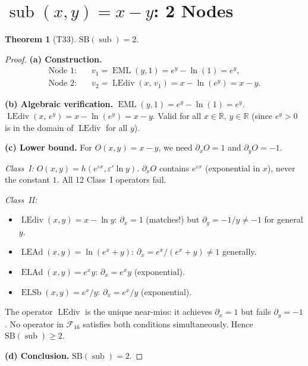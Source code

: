\documentclass[12pt,a4paper]{article}
\newtheorem{theorem}{Theorem}[section]
\theoremstyle{definition}
\newcommand{\EML}{\operatorname{EML}}
\newcommand{\ELAd}{\operatorname{ELAd}}
\newcommand{\ELSb}{\operatorname{ELSb}}
\newcommand{\LEAd}{\operatorname{LEAd}}
\newcommand{\LEdiv}{\operatorname{LEdiv}}
\newcommand{\subop}{\operatorname{sub}}
\newcommand{\SB}{\mathrm{SB}}
\newcommand{\F}{\mathcal{F}_{16}}
\begin{document}
\section{\texorpdfstring{$\subop(x,y) = x-y$}{sub(x,y)}: 2 Nodes}
\label{sec:sub}

\begin{theorem}[T33]
\label{thm:sub}
$\SB(\subop) = 2$.
\end{theorem}

\begin{proof}
\textbf{(a) Construction.}
\begin{align*}
  \text{Node 1:} &\quad v_1 = \EML(y,1) = e^y - \ln(1) = e^y, \\
  \text{Node 2:} &\quad v_2 = \LEdiv(x,\,v_1) = x - \ln(e^y) = x - y.
\end{align*}

\textbf{(b) Algebraic verification.}
$\EML(y,1) = e^y - \ln(1) = e^y$.
$\LEdiv(x,\,e^y) = x - \ln(e^y) = x - y$.
Valid for all $x\in\mathbb{R}$, $y\in\mathbb{R}$
(since $e^y > 0$ is in the domain of $\LEdiv$ for all $y$).

\textbf{(c) Lower bound.}
For $O(x,y) = x-y$, we need $\partial_x O = 1$ and $\partial_y O = -1$.

\emph{Class~I:} $O(x,y) = h(e^{\varepsilon x}, \varepsilon'\ln y)$.
$\partial_x O$ contains $e^{\varepsilon x}$ (exponential in $x$), never the
constant $1$.  All 12 Class~I operators fail.

\emph{Class~II:}
\begin{itemize}
  \item $\LEdiv(x,y) = x - \ln y$:\;
    $\partial_x = 1$ (matches!) but $\partial_y = -1/y \ne -1$ for general $y$.
  \item $\LEAd(x,y) = \ln(e^x+y)$:\;
    $\partial_x = e^x/(e^x+y) \ne 1$ generally.
  \item $\ELAd(x,y) = e^x y$:\;
    $\partial_x = e^x y$ (exponential).
  \item $\ELSb(x,y) = e^x/y$:\;
    $\partial_x = e^x/y$ (exponential).
\end{itemize}
The operator $\LEdiv$ is the unique near-miss: it achieves $\partial_x = 1$
but fails $\partial_y = -1$.  No operator in $\F$ satisfies both conditions
simultaneously.  Hence $\SB(\subop) \ge 2$.

\textbf{(d) Conclusion.} $\SB(\subop) = 2$.
\end{proof}
\end{document}
